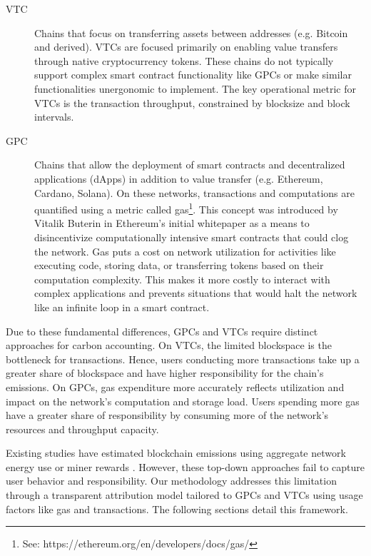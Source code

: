 \documentclass[11pt]{report}
\begin{document}
\begin{description}
    \item[\ac{VTC}] Chains that focus on transferring assets between addresses (e.g. Bitcoin and derived). VTCs are focused primarily on enabling value transfers through native cryptocurrency tokens. These chains do not typically support complex smart contract functionality like GPCs or make similar functionalities unergonomic to implement. The key operational metric for VTCs is the transaction throughput, constrained by blocksize and block intervals.

    \item[\ac{GPC}] Chains that allow the deployment of smart contracts and decentralized applications (dApps) in addition to value transfer (e.g. Ethereum, Cardano, Solana). On these networks, transactions and computations are quantified using a metric called gas\footnote{See: https://ethereum.org/en/developers/docs/gas/}. This concept was introduced by Vitalik Buterin in Ethereum's initial whitepaper \cite{buterinEthereumNextgenerationSmart} as a means to disincentivize computationally intensive smart contracts that could clog the network. Gas puts a cost on network utilization for activities like executing code, storing data, or transferring tokens based on their computation complexity. This makes it more costly to interact with complex applications and prevents situations that would halt the network like an infinite loop in a smart contract.
\end{description}

Due to these fundamental differences, GPCs and VTCs require distinct approaches for carbon accounting. On VTCs, the limited blockspace is the bottleneck for transactions. Hence, users conducting more transactions take up a greater share of blockspace and have higher responsibility for the chain's emissions. On GPCs, gas expenditure more accurately reflects utilization and impact on the network's computation and storage load. Users spending more gas have a greater share of responsibility by consuming more of the network's resources and throughput capacity.

Existing studies have estimated blockchain emissions using aggregate network energy use or miner rewards \cite{devriesCryptocurrenciesRoadSustainability2022,devriesRevisitingBitcoinCarbon2022,neumuellerCambridgeBitcoinElectricity2021,mcdonaldEthereumEmissionsBottomup2022}. However, these top-down approaches fail to capture user behavior and responsibility. Our methodology addresses this limitation through a transparent attribution model tailored to GPCs and VTCs using usage factors like gas and transactions. The following sections detail this framework.
\end{document}
